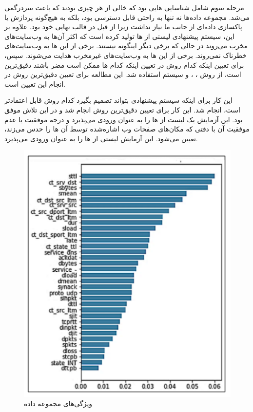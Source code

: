 \documentclass{CSICC2020}
\begin{document}
	مرحله سوم شامل شناسایی هایی بود که خالی از هر چیزی بودند که باعث سردرگمی می‌شد. مجموعه داده‌ها نه تنها به راحتی قابل دسترسی بود، بلکه به هیچ‌گونه پردازش یا پاکسازی داده‌ای از جانب ما نیاز نداشت زیرا از قبل در قالب نهایی خود بود. علاوه بر این، سیستم پیشنهادی لیستی از ها تولید کرده است که اکثر آن‌ها به وب‌سایت‌های مخرب می‌روند در حالی که برخی دیگر اینگونه نیستند. برخی از این ها به وب‌سایت‌های خطرناک نمی‌روند. برخی از این ها به وب‌سایت‌های غیرمخرب هدایت می‌شوند. سپس، برای تعیین اینکه کدام روش در تعیین اینکه کدام ها ممکن است مضر باشند دقیق‌ترین است، از روش ، ، و سیستم  استفاده شد. این مطالعه برای تعیین دقیق‌ترین روش در انجام این تعیین است.
	
	این کار برای اینکه سیستم پیشنهادی بتواند تصمیم بگیرد کدام روش قابل اعتمادتر است، انجام شد. این کار برای تعیین دقیق‌ترین روش انجام شد و در این تلاش موفق بود. این آزمایش یک لیست از ها را به عنوان ورودی می‌پذیرد و درجه موفقیت یا عدم موفقیت آن با دقتی که مکان‌های صفحات وب اشاره‌شده توسط آن ها را حدس می‌زند، تعیین می‌شود. این آزمایش لیستی از ها را به عنوان ورودی می‌پذیرد.
	\begin{figure}
		\includegraphics[width=.9\linewidth]{Images/dataset.pdf}
		\caption{
			ویژگی‌های مجموعه داده}
		\label{fig:sumXYPlot}
	\end{figure}
	
\end{document}
